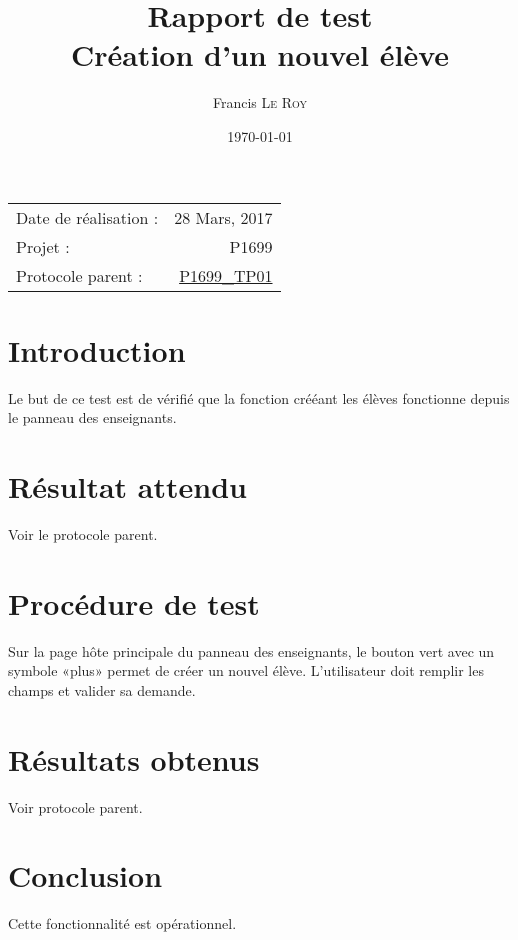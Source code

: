 \documentclass[10pt,a4paper,onecolumn]{article}
\title{Rapport de test \\ Création d'un nouvel élève}
\author{Francis \textsc{Le Roy}}
\date{\today}
\begin{document}
\maketitle
\thispagestyle{fancy}

\begin{center}
\begin{tabular}{l r}
Date de réalisation : & 28 Mars, 2017 \\
Projet : & P1699 \\
Protocole parent : & \href{run:../../../test_procedure/P1699_TP01.pdf}{P1699\_TP01}
\end{tabular}
\end{center}

\section{Introduction}
Le but de ce test est de vérifié que la fonction crééant les élèves fonctionne depuis le panneau des enseignants.
\section{Résultat attendu}
Voir le protocole parent.
\section{Procédure de test}
Sur la page hôte principale du panneau des enseignants, le bouton vert avec un symbole «plus» permet de créer un nouvel élève. L'utilisateur doit remplir les champs et valider sa demande.
\section{Résultats obtenus}
Voir protocole parent.
\section{Conclusion}
Cette fonctionnalité est opérationnel.
\end{document}
